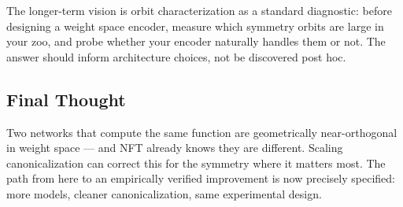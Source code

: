 The longer-term vision is orbit characterization as a standard diagnostic: before designing a weight space encoder, measure which symmetry orbits are large in your zoo, and probe whether your encoder naturally handles them or not. The answer should inform architecture choices, not be discovered post hoc.

\subsection*{Final Thought}

Two networks that compute the same function are geometrically near-orthogonal in weight space --- and NFT already knows they are different. Scaling canonicalization can correct this for the symmetry where it matters most. The path from here to an empirically verified improvement is now precisely specified: more models, cleaner canonicalization, same experimental design.
